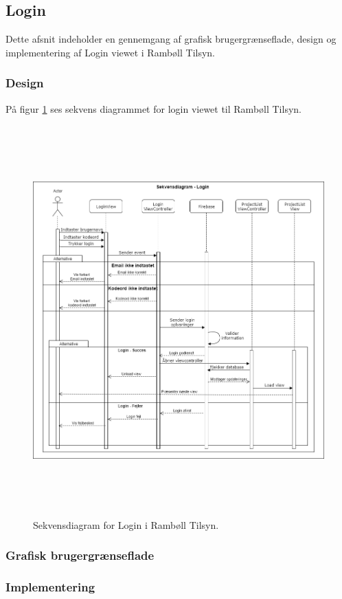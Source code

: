 \subsection{Login}
Dette afsnit indeholder en gennemgang af grafisk brugergrænseflade, design og implementering af Login viewet i Rambøll Tilsyn.

\subsubsection{Design}
På figur \ref{fig:LoginSekvens} ses sekvens diagrammet for login viewet til Rambøll Tilsyn.
\begin{figure}[H] %
	\centering
	\includegraphics[height=15cm, width=15cm]{../ArkitekturDesign/Design/Login/LoginSekvensDiagram}
	\caption{Sekvensdiagram for Login i Rambøll Tilsyn.}
	\label{fig:LoginSekvens}
\end{figure}

\subsubsection{Grafisk brugergrænseflade}

\subsubsection{Implementering}

\clearpage